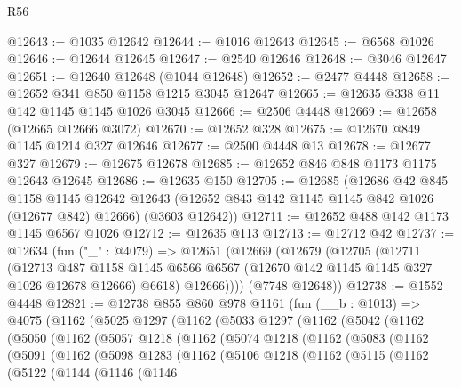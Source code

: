 \begin{lexlean}{R56}
\begin{coremodule}
@12643 := @1035 @12642
@12644 := @1016 @12643
@12645 := @6568 @1026
@12646 := @12644 @12645
@12647 := @2540 @12646
@12648 := @3046 @12647
@12651 := @12640 @12648 (@1044 @12648)
@12652 := @2477 @4448
@12658 := @12652 @341 @850 @1158 @1215 @3045 @12647
@12665 := @12635 @338 @11 @142 @1145 @1145 @1026 @3045
@12666 := @2506 @4448
@12669 := @12658 (@12665 @12666 @3072)
@12670 := @12652 @328
@12675 := @12670 @849 @1145 @1214 @327 @12646
@12677 := @2500 @4448 @13
@12678 := @12677 @327
@12679 := @12675 @12678
@12685 := @12652 @846 @848 @1173 @1175 @12643 @12645
@12686 := @12635 @150
@12705 := @12685
    (@12686
      @42
      @845
      @1158
      @1145
      @12642
      @12643
      (@12652 @843 @142 @1145 @1145 @842 @1026 (@12677 @842) @12666)
      (@3603 @12642))
@12711 := @12652 @488 @142 @1173 @1145 @6567 @1026
@12712 := @12635 @113
@12713 := @12712 @42
@12737 := @12634
    (fun ("_" : @4079) =>
    @12651
      (@12669
        (@12679
          (@12705
            (@12711
              (@12713
                @487
                @1158
                @1145
                @6566
                @6567
                (@12670 @142 @1145 @1145 @327 @1026 @12678 @12666)
                @6618)
              @12666))))
      (@7748 @12648))
@12738 := @1552 @4448
@12821 := @12738
    @855
    @860
    @978
    @1161
    (fun (__b : @1013) =>
    @4075
      (@1162
        (@5025
          @1297
          (@1162
            (@5033
              @1297
              (@1162
                (@5042
                  (@1162
                    (@5050
                      (@1162
                        (@5057
                          @1218
                          (@1162
                            (@5074
                              @1218
                              (@1162
                                (@5083
                                  (@1162
                                    (@5091
                                      (@1162
                                        (@5098
                                          @1283
                                          (@1162
                                            (@5106
                                              @1218
                                              (@1162
                                                (@5115
                                                  (@1162
                                                    (@5122
                                                      (@1144
                                                        (@1146
                                                          (@1146

\end{coremodule}
\end{lexlean}
